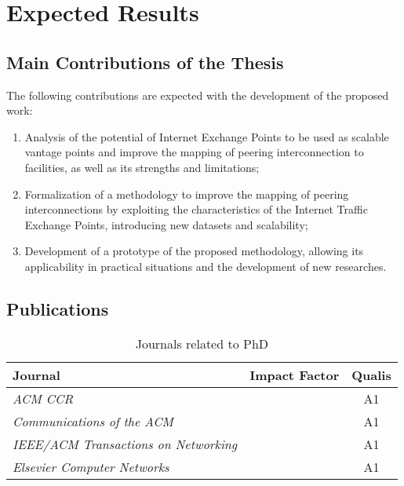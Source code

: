 \chapter{Expected Results}\label{cap:expected-results}
\thispagestyle{empty}

	\section{Main Contributions of the Thesis}\label{cap:contributions}
	\thispagestyle{empty}

	The following contributions are expected with the development of the proposed work:

	\begin{enumerate}
    \item Analysis of the potential of Internet Exchange Points to be used as scalable vantage points and improve the mapping of peering interconnection to facilities, as well as its strengths and limitations;

    \item Formalization of a methodology to improve the mapping of peering interconnections by exploiting the characteristics of the Internet Traffic Exchange Points, introducing new datasets and scalability;

    \item Development of a prototype of the proposed methodology, allowing its applicability in practical situations and the development of new researches.
    \end{enumerate}


	\section{Publications}
	\label{sec:publications}

	\begin{table}[htp]
	\centering
	\begin{tabularx}{\textwidth}{l | c | c}
	\hline \hline
	{\bf Journal}                                           & {\bf Impact Factor} & \textbf{Qualis} \\ \hline
	\textit{ACM CCR}                					      &                   & A1 \\ \hline
    \textit{Communications of the ACM}                        &                   & A1 \\ \hline
	\textit{IEEE/ACM Transactions on Networking}              &                   & A1 \\ \hline
	\textit{Elsevier Computer Networks}                       &                   & A1 \\ \hline
	

	\hline
	\end{tabularx}
	\caption{Journals related to PhD}
	\label{tbl:journals}
	\end{table}

